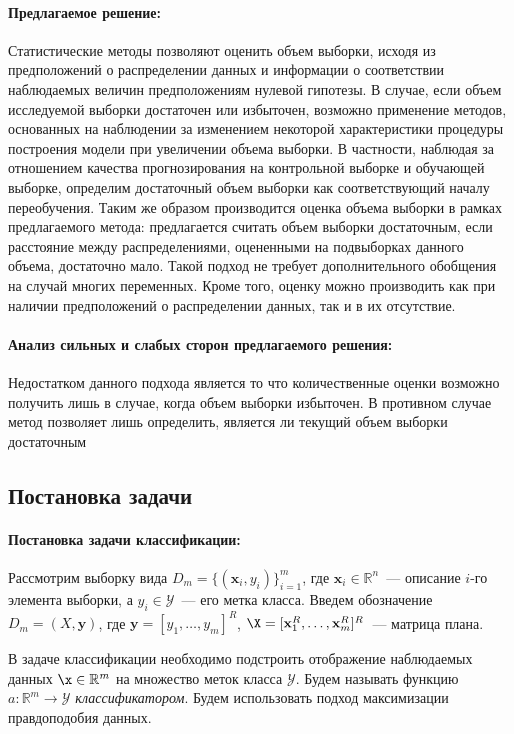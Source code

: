 \documentclass[12pt,twoside]{article}
\begin{document}
\paragraph{Предлагаемое решение:}
Статистические методы позволяют оценить объем выборки, исходя из предположений о распределении данных и информации о соответствии наблюдаемых величин предположениям нулевой гипотезы. В случае, если объем исследуемой выборки достаточен или избыточен, возможно применение методов, основанных на наблюдении за изменением некоторой характеристики процедуры построения модели при увеличении объема выборки. В частности, наблюдая за отношением качества прогнозирования на контрольной выборке и обучающей выборке, определим достаточный объем выборки как соответствующий началу переобучения. Таким же образом производится оценка объема выборки в рамках предлагаемого метода: предлагается считать объем выборки достаточным, если расстояние между распределениями, оцененными на подвыборках данного объема, достаточно мало. Такой подход не требует дополнительного обобщения на случай многих переменных. Кроме того, оценку можно производить как при наличии предположений о распределении данных, так и в их отсутствие.
\paragraph{Анализ сильных и слабых сторон предлагаемого решения:}
Недостатком данного подхода является то что количественные оценки возможно получить лишь в случае, когда объем выборки избыточен. В противном случае метод позволяет лишь определить, является ли текущий объем выборки достаточным

\subsection{Постановка задачи}
\paragraph{Постановка задачи классификации:}
Рассмотрим выборку вида $D_m =\{(\mathbf{x}_i, y_i)\}_{i = 1}^{m}$, где $\mathbf{x}_i\in\mathbb{R}^n$~--- описание $i$-го элемента выборки, а $y_i\in \mathcal{Y}$~--- его метка класса. Введем обозначение $D_m = (X,\mathbf{y})$, где $\mathbf{y} =
[y_1,\dots,y_m]^{R}$, $\X = [\mathbf{x}^{R}_1,\dots,\mathbf{x}^{R}_m]^{R}$~--- матрица плана.

В задаче классификации необходимо подстроить отображение наблюдаемых данных $\x \in \mathbb{R}^m$ на множество меток класса $\mathcal{Y}$. Будем называть функцию $a: \mathbb{R}^{m} \rightarrow \mathcal{Y}$ \textit{классификатором}.  Будем использовать подход максимизации правдоподобия данных.
\end{document}
